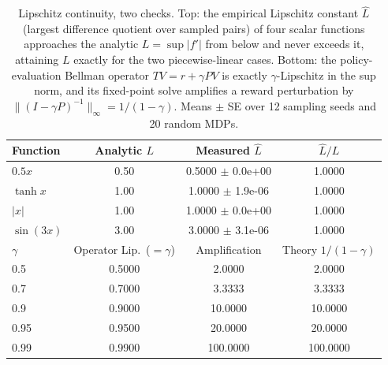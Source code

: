 \begin{table}[h]
\centering
\caption{Lipschitz continuity, two checks. Top: the empirical Lipschitz constant $\hat L$ (largest difference quotient over sampled pairs) of four scalar functions approaches the analytic $L = \sup|f'|$ from below and never exceeds it, attaining $L$ exactly for the two piecewise-linear cases. Bottom: the policy-evaluation Bellman operator $TV = r + \gamma P V$ is exactly $\gamma$-Lipschitz in the sup norm, and its fixed-point solve amplifies a reward perturbation by $\|(I-\gamma P)^{-1}\|_\infty = 1/(1-\gamma)$. Means $\pm$ SE over 12 sampling seeds and 20 random MDPs.}
\label{tab:prelim_lipschitz}
\begin{tabular}{lccc}
\hline
Function & Analytic $L$ & Measured $\hat L$ & $\hat L / L$ \\
\hline
$0.5x$ & 0.50 & 0.5000 $\pm$ 0.0e+00 & 1.0000 \\
$\tanh x$ & 1.00 & 1.0000 $\pm$ 1.9e-06 & 1.0000 \\
$|x|$ & 1.00 & 1.0000 $\pm$ 0.0e+00 & 1.0000 \\
$\sin(3x)$ & 3.00 & 3.0000 $\pm$ 3.1e-06 & 1.0000 \\
\hline
$\gamma$ & Operator Lip.\ ($=\gamma$) & Amplification & Theory $1/(1-\gamma)$ \\
\hline
0.5 & 0.5000 & 2.0000 & 2.0000 \\
0.7 & 0.7000 & 3.3333 & 3.3333 \\
0.9 & 0.9000 & 10.0000 & 10.0000 \\
0.95 & 0.9500 & 20.0000 & 20.0000 \\
0.99 & 0.9900 & 100.0000 & 100.0000 \\
\hline
\end{tabular}
\end{table}

